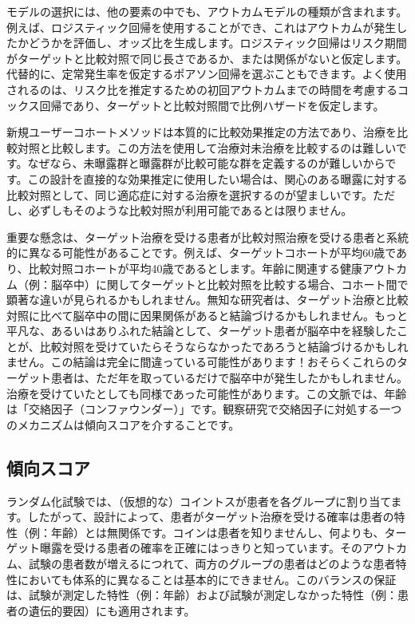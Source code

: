 \documentclass[
  11pt]{book}
\makeatletter
\newenvironment{kframe}{%
\medskip{}
\setlength{\fboxsep}{.8em}
 \def\at@end@of@kframe{}%
 \ifinner\ifhmode%
  \def\at@end@of@kframe{\end{minipage}}%
  \begin{minipage}{\columnwidth}%
 \fi\fi%
 \def\FrameCommand##1{\hskip\@totalleftmargin \hskip-\fboxsep
 \colorbox{myShadeColor}{##1}\hskip-\fboxsep
     \hskip-\linewidth \hskip-\@totalleftmargin \hskip\columnwidth}%
 \MakeFramed {\advance\hsize-\width
   \@totalleftmargin\z@ \linewidth\hsize
   \@setminipage}}%
 {\par\unskip\endMakeFramed%
 \at@end@of@kframe}
\newenvironment{rmdblock}[1]
  {
  \begin{itemize}
  \renewcommand{\labelitemi}{
    \raisebox{-.7\height}[0pt][0pt]{
      {\setkeys{Gin}{width=3em,keepaspectratio}\texttt{[image: images/\#1]}}
    }
  }
  \setlength{\fboxsep}{1em}
  \begin{kframe}
  \item
  }
  {
  \end{kframe}
  \end{itemize}
  }
\newenvironment{rmdimportant}
  {\begin{rmdblock}{important}}
  {\end{rmdblock}}
\theoremstyle{definition}
\theoremstyle{definition}
\theoremstyle{definition}
\theoremstyle{definition}
\theoremstyle{remark}
\makeatother
\begin{document}
モデルの選択には、他の要素の中でも、アウトカムモデルの種類が含まれます。例えば、ロジスティック回帰を使用することができ、これはアウトカムが発生したかどうかを評価し、オッズ比を生成します。ロジスティック回帰はリスク期間がターゲットと比較対照で同じ長さであるか、または関係がないと仮定します。代替的に、定常発生率を仮定するポアソン回帰を選ぶこともできます。よく使用されるのは、リスク比を推定するための初回アウトカムまでの時間を考慮するコックス回帰であり、ターゲットと比較対照間で比例ハザードを仮定します。    

\begin{rmdimportant}
新規ユーザーコホートメソッドは本質的に比較効果推定の方法であり、治療を比較対照と比較します。この方法を使用して治療対未治療を比較するのは難しいです。なぜなら、未曝露群と曝露群が比較可能な群を定義するのが難しいからです。この設計を直接的な効果推定に使用したい場合は、関心のある曝露に対する比較対照として、同じ適応症に対する治療を選択するのが望ましいです。ただし、必ずしもそのような比較対照が利用可能であるとは限りません。
\end{rmdimportant}

重要な懸念は、ターゲット治療を受ける患者が比較対照治療を受ける患者と系統的に異なる可能性があることです。例えば、ターゲットコホートが平均60歳であり、比較対照コホートが平均40歳であるとします。年齢に関連する健康アウトカム（例：脳卒中）に関してターゲットと比較対照を比較する場合、コホート間で顕著な違いが見られるかもしれません。無知な研究者は、ターゲット治療と比較対照に比べて脳卒中の間に因果関係があると結論づけるかもしれません。もっと平凡な、あるいはありふれた結論として、ターゲット患者が脳卒中を経験したことが、比較対照を受けていたらそうならなかったであろうと結論づけるかもしれません。この結論は完全に間違っている可能性があります！おそらくこれらのターゲット患者は、ただ年を取っているだけで脳卒中が発生したかもしれません。治療を受けていたとしても同様であった可能性があります。この文脈では、年齢は「交絡因子（コンファウンダー）」です。観察研究で交絡因子に対処する一つのメカニズムは傾向スコアを介することです。 

\subsection{傾向スコア}\label{ux50beux5411ux30b9ux30b3ux30a2}


ランダム化試験では、（仮想的な）コイントスが患者を各グループに割り当てます。したがって、設計によって、患者がターゲット治療を受ける確率は患者の特性（例：年齢）とは無関係です。コインは患者を知りませんし、何よりも、ターゲット曝露を受ける患者の確率を正確にはっきりと知っています。そのアウトカム、試験の患者数が増えるにつれて、両方のグループの患者はどのような患者特性においても体系的に異なることは基本的にできません。このバランスの保証は、試験が測定した特性（例：年齢）および試験が測定しなかった特性（例：患者の遺伝的要因）にも適用されます。 
\end{document}
